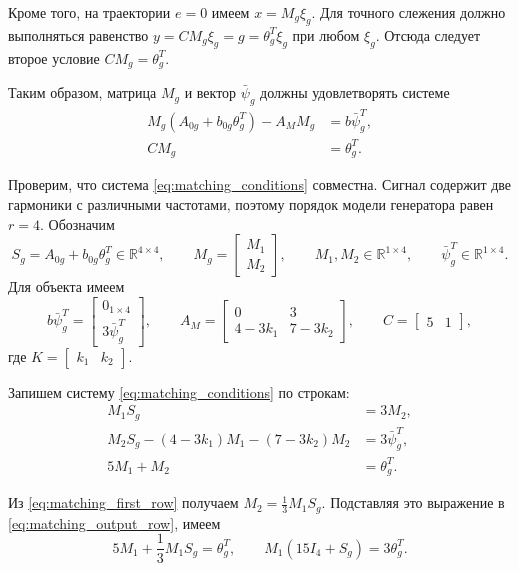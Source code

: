Кроме того, на траектории $e=0$ имеем $x=M_g\xi_g$.
Для точного слежения должно выполняться равенство
$y=CM_g\xi_g=g=\theta_g^T\xi_g$ при любом $\xi_g$.
Отсюда следует второе условие $CM_g=\theta_g^T$.

Таким образом, матрица $M_g$ и вектор $\bar{\psi}_g$
должны удовлетворять системе
\begin{equation}
\begin{aligned}
    M_g(A_{0g}+b_{0g}\theta_g^T)-A_MM_g
        &= b\bar{\psi}_g^T,\\
    CM_g &= \theta_g^T.
\end{aligned}
\label{eq:matching_conditions}
\end{equation}

Проверим, что система \eqref{eq:matching_conditions} совместна.
Сигнал содержит две гармоники с различными частотами, поэтому
порядок модели генератора равен $r=4$. Обозначим
\[
    S_g=A_{0g}+b_{0g}\theta_g^T\in\mathbb{R}^{4\times4},
    \qquad
    M_g=\begin{bmatrix}M_1\\M_2\end{bmatrix},
    \qquad M_1,M_2\in\mathbb{R}^{1\times4},
    \qquad \bar{\psi}_g^T\in\mathbb{R}^{1\times4}.
\]
Для объекта имеем
\[
    b\bar{\psi}_g^T=
    \begin{bmatrix}
        0_{1\times4}\\
        3\bar{\psi}_g^T
    \end{bmatrix},
    \qquad
    A_M=
    \begin{bmatrix}
        0 & 3\\
        4-3k_1 & 7-3k_2
    \end{bmatrix},
    \qquad
    C=\begin{bmatrix}5 & 1\end{bmatrix},
\]
где $K=\begin{bmatrix}k_1 & k_2\end{bmatrix}$.

Запишем систему \eqref{eq:matching_conditions} по строкам:
\begin{align}
    M_1S_g &= 3M_2, \label{eq:matching_first_row}\\
    M_2S_g-(4-3k_1)M_1-(7-3k_2)M_2
        &= 3\bar{\psi}_g^T, \label{eq:matching_second_row}\\
    5M_1+M_2 &= \theta_g^T. \label{eq:matching_output_row}
\end{align}

Из \eqref{eq:matching_first_row} получаем $M_2=\frac{1}{3}M_1S_g$.
Подставляя это выражение в \eqref{eq:matching_output_row}, имеем
$$
5M_1+\frac{1}{3}M_1S_g=\theta_g^T,
\qquad
M_1(15I_4+S_g)=3\theta_g^T.
$$

